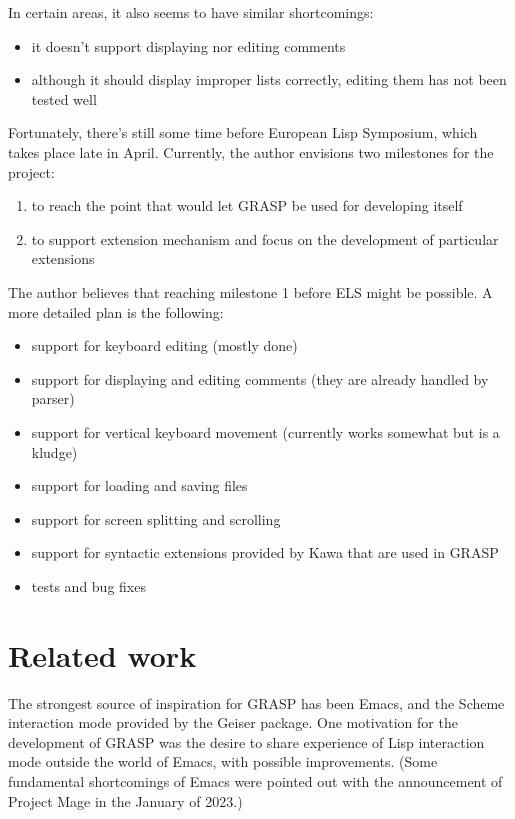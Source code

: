 \documentclass[11pt]{article}
\begin{document}
In certain areas, it also seems to have similar
shortcomings:
\begin{itemize}
\item it doesn't support displaying nor editing
comments
\item although it should display improper lists correctly, 
editing them has not been tested well
\end{itemize}

Fortunately, there's still some time before
European Lisp Symposium, which takes place late
in April. Currently, the author envisions two
milestones for the project:
\begin{enumerate}
\item to reach the point that would let GRASP
be used for developing itself
\item to support extension mechanism and focus
on the development of particular extensions
\end{enumerate}

The author believes that reaching milestone 1
before ELS might be possible. A more detailed
plan is the following:
\begin{itemize}
\item support for keyboard editing (mostly done)
\item support for displaying and editing comments
(they are already handled by parser)
\item support for vertical keyboard movement
(currently works somewhat but is a kludge)
\item support for loading and saving files
\item support for screen splitting and scrolling
\item support for syntactic extensions provided
by Kawa that are used in GRASP
\item tests and bug fixes
\end{itemize}

\section{Related work}
\label{sec:orgc53c98e}

The strongest source of inspiration for GRASP
has been Emacs, and the Scheme interaction
mode provided by the Geiser package. One
motivation for the development of GRASP was
the desire to share experience of Lisp interaction
mode outside the world of Emacs, with possible
improvements. (Some fundamental shortcomings
of Emacs were pointed out with the announcement
of Project Mage in the January of 2023.)
\end{document}
